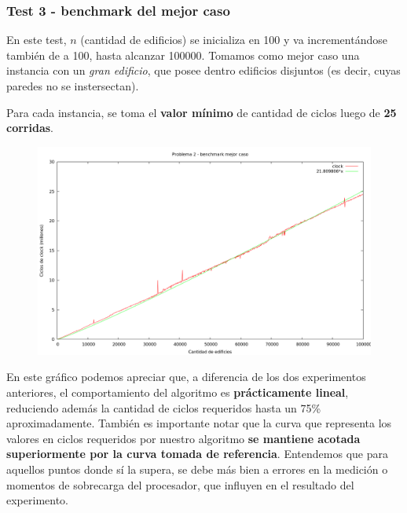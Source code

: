 \newpage


\subsubsection{Test 3 - benchmark del mejor caso}

En este test, $n$ (cantidad de edificios) se inicializa en 100 y va incrementándose también de a 100, 
hasta alcanzar 100000. Tomamos como mejor caso una instancia con un \textit{gran edificio}, que posee dentro 
edificios disjuntos (es decir, cuyas paredes no se instersectan).

Para cada instancia, se toma el \textbf{valor mínimo} de cantidad de ciclos luego de \textbf{25 corridas}.


\begin{figure}[h]
  \begin{center}
    \includegraphics[scale=0.35]{imagenes/grafico-2-mejor.png}
  \end{center}
\end{figure}


En este gráfico podemos apreciar que, a diferencia de los dos experimentos anteriores, el comportamiento 
del algoritmo es \textbf{prácticamente lineal}, reduciendo además la cantidad de ciclos requeridos hasta un 75\% 
aproximadamente. También es importante notar que la curva que representa los valores en ciclos requeridos 
por nuestro algoritmo \textbf{se mantiene acotada superiormente por la curva tomada de referencia}. Entendemos que 
para aquellos puntos donde sí la supera, se debe más bien a errores en la medición o momentos de sobrecarga 
del procesador, que influyen en el resultado del experimento. 
